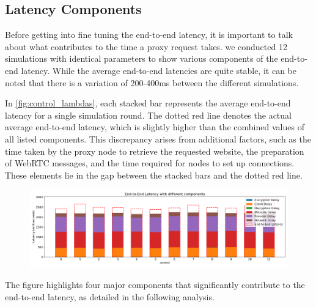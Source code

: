 \documentclass[a4paper,11pt,oneside]{report}
\begin{document}
\subsection{Latency Components}
Before getting into fine tuning the end-to-end latency, it is important to talk about what contributes to the time a proxy request takes. we conducted 12 simulations with identical parameters to show various components of the end-to-end latency. While the average end-to-end latencies are quite stable, it can be noted that there is a variation of 200-400ms between the different simulations.

In \autoref{fig:control_lambdas}, each stacked bar represents the average end-to-end latency for a single simulation round. The dotted red line denotes the actual average end-to-end latency, which is slightly higher than the combined values of all listed components. This discrepancy arises from additional factors, such as the time taken by the proxy node to retrieve the requested website, the preparation of WebRTC messages, and the time required for nodes to set up connections. These elements lie in the gap between the stacked bars and the dotted red line.


\begin{figure}[htbp]
    \centering
    \includegraphics[width=\textwidth]{plots/control_latency_components.png}
    \caption{}
    \label{fig:control_lambdas}
\end{figure}

The figure highlights four major components that significantly contribute to the end-to-end latency, as detailed in the following analysis.
\end{document}
